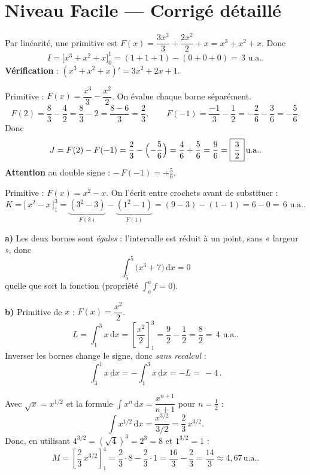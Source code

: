 \documentclass[11pt,a4paper]{article}
\newcommand{\dd}{\mathrm{d}}
\newcommand{\ua}{\,\text{u.a.}}
\begin{document}
\section*{Niveau Facile — Corrigé détaillé}

\begin{corr}
Par linéarité, une primitive est $F(x)=\dfrac{3x^3}{3}+\dfrac{2x^2}{2}+x=x^3+x^2+x$. Donc
\[
I=\bigl[x^3+x^2+x\bigr]_0^1=(1+1+1)-(0+0+0)=\boxed{\,3\,}\ua.
\]
\textbf{Vérification} : $(x^3+x^2+x)'=3x^2+2x+1$. \checkmark
\end{corr}

\begin{corr}
Primitive : $F(x)=\dfrac{x^3}{3}-\dfrac{x^2}{2}$. On évalue chaque borne séparément.
\[
F(2)=\frac{8}{3}-\frac{4}{2}=\frac{8}{3}-2=\frac{8-6}{3}=\frac{2}{3},
\qquad
F(-1)=\frac{-1}{3}-\frac{1}{2}=-\frac{2}{6}-\frac{3}{6}=-\frac{5}{6}.
\]
Donc
\[
J=F(2)-F(-1)=\frac{2}{3}-\Bigl(-\frac{5}{6}\Bigr)=\frac{4}{6}+\frac{5}{6}=\frac{9}{6}=\boxed{\,\frac{3}{2}\,}\ua.
\]
\textbf{Attention} au double signe : $-\,F(-1)=+\tfrac56$.
\end{corr}

\begin{corr}
Primitive : $F(x)=x^2-x$. On l'écrit entre crochets avant de substituer :
\[
K=\bigl[\,x^2-x\,\bigr]_1^3=\underbrace{(3^2-3)}_{F(3)}-\underbrace{(1^2-1)}_{F(1)}=(9-3)-(1-1)=6-0=\boxed{\,6\,}\ua.
\]
\end{corr}

\begin{corr}
\textbf{a)} Les deux bornes sont \emph{égales} : l'intervalle est réduit à un point, sans « largeur »,
donc
\[
\int_{5}^{5}\bigl(x^3+7\bigr)\,\dd x=0
\]
quelle que soit la fonction (propriété $\int_a^a f=0$).

\smallskip
\textbf{b)} Primitive de $x$ : $F(x)=\dfrac{x^2}{2}$.
\[
L=\int_{1}^{3} x\,\dd x=\left[\frac{x^2}{2}\right]_1^3=\frac{9}{2}-\frac{1}{2}=\frac{8}{2}=\boxed{\,4\,}\ua.
\]
Inverser les bornes change le signe, donc \emph{sans recalcul} :
\[
\int_{3}^{1} x\,\dd x=-\int_{1}^{3} x\,\dd x=-L=\boxed{\,-4\,}.
\]
\end{corr}

\begin{corr}
Avec $\sqrt{x}=x^{1/2}$ et la formule $\int x^n\,\dd x=\dfrac{x^{n+1}}{n+1}$ pour $n=\tfrac12$ :
\[
\int x^{1/2}\,\dd x=\frac{x^{3/2}}{3/2}=\frac{2}{3}\,x^{3/2}.
\]
Donc, en utilisant $4^{3/2}=(\sqrt4)^3=2^3=8$ et $1^{3/2}=1$ :
\[
M=\left[\frac{2}{3}\,x^{3/2}\right]_1^4=\frac{2}{3}\cdot 8-\frac{2}{3}\cdot 1=\frac{16}{3}-\frac{2}{3}=\frac{14}{3}
\approx 4{,}67\ua.
\]
\end{corr}
\end{document}
